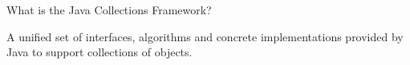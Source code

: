 What is the Java Collections Framework? \\
\begin{answer}
A unified set of interfaces, algorithms and concrete implementations
provided by Java to support collections of objects.
\end{answer}


\vspace{24pt}
